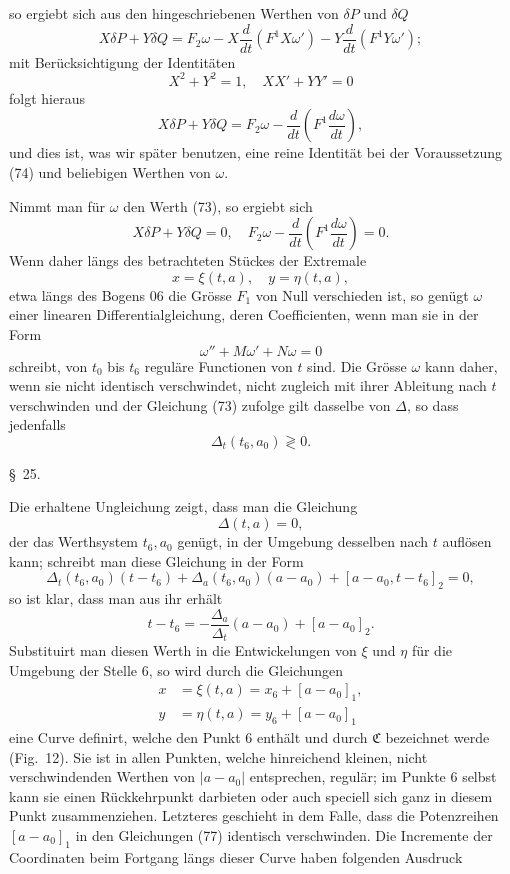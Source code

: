 \documentclass[11pt,a4paper,leqno]{article}
\begin{document}
so ergiebt sich aus den hingeschriebenen Werthen von $\delta P$ und $\delta Q$
\[
X\delta P+Y\delta Q
=F_2\omega-X\frac{d}{dt}(F^1X\omega')-Y\frac{d}{dt}(F^1Y\omega');
\]
mit Berücksichtigung der Identitäten
\[
X^2+Y^2=1,\quad XX'+YY'=0
\]
folgt hieraus
\begin{equation}\tag{75}
X\delta P+Y\delta Q=F_2\omega-\frac{d}{dt}\left(F^1\frac{d\omega}{dt}\right),
\end{equation}
und dies ist, was wir später benutzen, eine reine Identität bei der Voraussetzung (74) und beliebigen Werthen von $\omega$.

Nimmt man für $\omega$ den Werth (73), so ergiebt sich
\[
X\delta P+Y\delta Q=0,
\quad
F_2\omega-\frac{d}{dt}\left(F^1\frac{d\omega}{dt}\right)=0.
\]
Wenn daher längs des betrachteten Stückes der Extremale
\[
x=\xi(t,a),\quad y=\eta(t,a),
\]
etwa längs des Bogens 06 die Grösse $F_1$ von Null verschieden ist, so genügt $\omega$ einer linearen Differentialgleichung, deren Coefficienten, wenn man sie in der Form
\[
\omega''+M\omega'+N\omega=0
\]
schreibt, von $t_0$ bis $t_6$ reguläre Functionen von $t$ sind. Die Grösse $\omega$ kann daher, wenn sie nicht identisch verschwindet, nicht zugleich mit ihrer Ableitung nach $t$ verschwinden und der Gleichung (73) zufolge gilt dasselbe von $\Delta$, so dass jedenfalls
\[
\Delta_t(t_6,a_0)\gtrless0.
\]

\begin{center}{\large \S~25.}\end{center}

Die erhaltene Ungleichung zeigt, dass man die Gleichung
\begin{equation}\tag{76}
\Delta(t,a)=0,
\end{equation}
der das Werthsystem $t_6,a_0$ genügt, in der Umgebung desselben nach $t$ auflösen kann; schreibt man diese Gleichung in der Form
\[
\Delta_t(t_6,a_0)(t-t_6)+\Delta_a(t_6,a_0)(a-a_0)+[a-a_0,t-t_6]_2=0,
\]
so ist klar, dass man aus ihr erhält
\[
t-t_6=-\frac{\Delta_a}{\Delta_t}(a-a_0)+[a-a_0]_2.
\]
Substituirt man diesen Werth in die Entwickelungen von $\xi$ und $\eta$ für die Umgebung der Stelle 6, so wird durch die Gleichungen
\begin{equation}\tag{77}
\begin{aligned}
x&=\xi(t,a)=x_6+[a-a_0]_1,\\
y&=\eta(t,a)=y_6+[a-a_0]_1
\end{aligned}
\end{equation}
eine Curve definirt, welche den Punkt 6 enthält und durch $\mathfrak{C}$ bezeichnet werde (Fig.~12). Sie ist in allen Punkten, welche hinreichend kleinen, nicht verschwindenden Werthen von $|a-a_0|$ entsprechen, regulär; im Punkte 6 selbst kann sie einen Rückkehrpunkt darbieten oder auch speciell sich ganz in diesem Punkt zusammenziehen. Letzteres geschieht in dem Falle, dass die Potenzreihen $[a-a_0]_1$ in den Gleichungen (77) identisch verschwinden. Die Incremente der Coordinaten beim Fortgang längs dieser Curve haben folgenden Ausdruck
\end{document}
